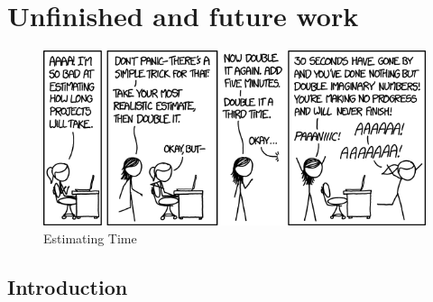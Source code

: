 \chapter{Unfinished and future work}
\begin{figure}[H]
    \centering
    \includegraphics[width=\textwidth]{figures/estimating_time.png}
    \caption{Estimating Time \cite{xkcdEstimatingTime2016}}
    \label{fig:xkcd_time}
\end{figure}

\section{Introduction}



